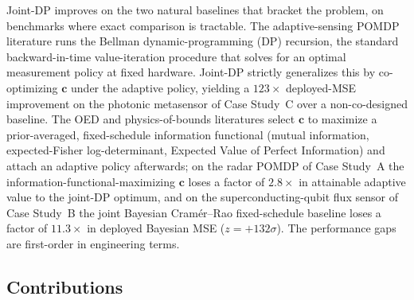 \documentclass[11pt,a4paper,onecolumn]{article}
\newcommand{\bc}{\bm{c}}
\begin{document}
Joint-DP improves on the two natural baselines that bracket the problem, on benchmarks where exact comparison is tractable.  The adaptive-sensing POMDP literature runs the Bellman dynamic-programming (DP) recursion, the standard backward-in-time value-iteration procedure that solves for an optimal measurement policy at fixed hardware.  Joint-DP strictly generalizes this by co-optimizing $\bc$ under the adaptive policy, yielding a $123\times$ deployed-MSE improvement on the photonic metasensor of Case Study~C over a non-co-designed baseline.  The OED and physics-of-bounds literatures select $\bc$ to maximize a prior-averaged, fixed-schedule information functional (mutual information, expected-Fisher log-determinant, Expected Value of Perfect Information) and attach an adaptive policy afterwards; on the radar POMDP of Case Study~A the information-functional-maximizing $\bc$ loses a factor of $2.8\times$ in attainable adaptive value to the joint-DP optimum, and on the superconducting-qubit flux sensor of Case Study~B the joint Bayesian Cram\'er--Rao fixed-schedule baseline loses a factor of $11.3\times$ in deployed Bayesian MSE ($z=+132\sigma$).  The performance gaps are first-order in engineering terms.

\subsection{Contributions}
\end{document}
